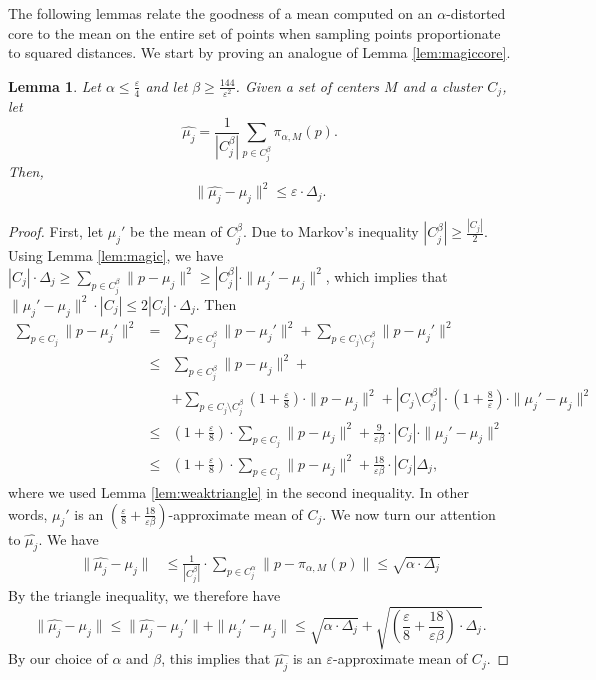 \documentclass[11pt]{article}
\newtheorem{lemma}[theorem]{Lemma}
\begin{document}
The following lemmas relate the goodness of a mean computed on an $\alpha$-distorted core to the mean on the entire set of points when sampling points proportionate to squared distances. We start by proving an analogue of Lemma \ref{lem:magiccore}.
\begin{lemma}
\label{lem:core}
Let $\alpha \leq\frac{\varepsilon}{4}$ and let $\beta\geq \frac{144}{\varepsilon^{2}}$.
Given a set of centers $M$ and a cluster $C_j$, let 
$$\hat{\mu_j} = \frac{1}{|C_j^\beta|}\sum_{p\in C_j^\beta} \pi_{\alpha,M}(p).$$ 
Then,
$$\|\hat{\mu_j}-\mu_j\|^2\leq \varepsilon\cdot \Delta_j.$$
\end{lemma}
\begin{proof}
First, let $\mu_j'$ be the mean of $C_j^\beta$. Due to Markov's inequality $|C_j^\beta|\geq \frac{|C_j|}{2}$. Using Lemma \ref{lem:magic}, we have $|C_j|\cdot \Delta_j \geq \sum_{p\in C_j^\beta}\|p-\mu_j\|^2 \geq |C_j^\beta|\cdot\|\mu_j'-\mu_j\|^2$, which implies that $\|\mu_j'-\mu_j\|^2 \cdot |C_j|\leq 2|C_j| \cdot \Delta_j$. Then
\begin{eqnarray*}
 \sum_{p\in C_j} \|p-\mu_j'\|^2 
& = & \sum_{p\in C_j^\beta}\|p-\mu_j'\|^2 + \sum_{p\in C_j\setminus C_j^\beta}\|p-\mu_j'\|^2\\
&\leq& \sum_{p\in C_j^\beta}\|p-\mu_j\|^2 + \\
& & + \sum_{p\in C_j\setminus C_j^\beta}\left(1+\frac{\varepsilon}{8}\right)\cdot \|p-\mu_j\|^2 + |C_j\setminus C_j^\beta|\cdot \left(1+\frac{8}{\varepsilon}\right)\cdot \|\mu_j'-\mu_j\|^2 \\
&\leq& \left(1+\frac{\varepsilon}{8}\right)\cdot \sum_{p\in C_j}\|p-\mu_j\|^2  + \frac{9}{\varepsilon\beta} \cdot |C_j| \cdot \|\mu_j'-\mu_j\|^2 \\
&\leq& \left(1+\frac{\varepsilon}{8}\right)\cdot \sum_{p\in C_j}\|p-\mu_j\|^2  + \frac{18}{\varepsilon\beta} \cdot |C_j|\Delta_j,
\end{eqnarray*}
where we used Lemma \ref{lem:weaktriangle} in the second inequality.
In other words, $\mu_j'$ is an $\left(\frac{\varepsilon}{8} + \frac{18}{\varepsilon\beta}\right)$-approximate mean of $C_j$. We now turn our attention to $\hat{\mu_j}$. We have
\begin{align*}
\|\hat{\mu_j}-\mu_j\| & \leq \frac{1}{|C_j^\beta|}\cdot \sum_{p\in C_j^\alpha}\|p-\pi_{\alpha,M}(p)\| \leq \sqrt{\alpha\cdot \Delta_j}
\end{align*}
By the triangle inequality, we therefore have
$$\|\hat{\mu_j}-\mu_j\|\leq \|\hat{\mu_j} - \mu_j'\|+\|\mu_j'-\mu_j\| \leq \sqrt{\alpha\cdot \Delta_j} + \sqrt{\left(\frac{\varepsilon}{8} + \frac{18}{\varepsilon\beta}\right)\cdot \Delta_j}.$$
By our choice of $\alpha$ and $\beta$, this implies that $\hat{\mu_j}$ is an $\varepsilon$-approximate mean of $C_j$. 
\end{proof}
\end{document}
